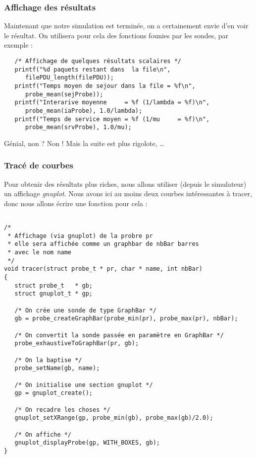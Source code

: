 \documentclass{article}
\begin{document}
\subsubsection{Affichage des résultats}

   Maintenant que notre simulation est terminée, on a certainement 
envie d'en voir le résultat. On utilisera pour cela des fonctions
founies par les sondes, par exemple :

\begin{verbatim}
   /* Affichage de quelques résultats scalaires */
   printf("%d paquets restant dans  la file\n",
	  filePDU_length(filePDU));
   printf("Temps moyen de sejour dans la file = %f\n",
	  probe_mean(sejProbe));
   printf("Interarive moyenne     = %f (1/lambda = %f)\n",
	  probe_mean(iaProbe), 1.0/lambda);
   printf("Temps de service moyen = %f (1/mu     = %f)\n",
	  probe_mean(srvProbe), 1.0/mu);
\end{verbatim}

   Génial, non ? Non ! Mais la suite est plus rigolote, \ldots

%
\subsubsection{Tracé de courbes}

   Pour obtenir des résultats plus riches, nous allons utiliser
(depuis le simulateur) un affichage {\em gnuplot}. Nous avons ici au
moins deux courbes intéressantes à tracer, donc nous allons écrire une
 fonction pour cela :

\begin{verbatim}

/*
 * Affichage (via gnuplot) de la probre pr
 * elle sera affichée comme un graphbar de nbBar barres
 * avec le nom name
 */
void tracer(struct probe_t * pr, char * name, int nbBar)
{
   struct probe_t   * gb;
   struct gnuplot_t * gp;

   /* On crée une sonde de type GraphBar */
   gb = probe_createGraphBar(probe_min(pr), probe_max(pr), nbBar);

   /* On convertit la sonde passée en paramètre en GraphBar */
   probe_exhaustiveToGraphBar(pr, gb);

   /* On la baptise */
   probe_setName(gb, name);

   /* On initialise une section gnuplot */
   gp = gnuplot_create();

   /* On recadre les choses */
   gnuplot_setXRange(gp, probe_min(gb), probe_max(gb)/2.0);

   /* On affiche */
   gnuplot_displayProbe(gp, WITH_BOXES, gb);
}
\end{verbatim}
\end{document}
